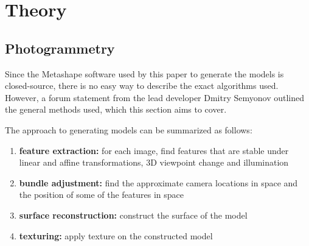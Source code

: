 % 
% 
% 
% 

\chapter{Theory}


\section{Photogrammetry}
Since the Metashape software used by this paper to generate the models is closed-source, there is no easy way to describe the exact algorithms used.
However, a forum statement from the lead developer Dmitry Semyonov \parencite{metashapeForumPost} outlined the general methods used, which this section aims to cover.

The approach to generating models can be summarized as follows:

\begin{enumerate}
	\item \textbf{feature extraction:} for each image, find features that are stable under linear and affine transformations, 3D viewpoint change and illumination
	\item \textbf{bundle adjustment:} find the approximate camera locations in space and the position of some of the features in space
	\item \textbf{surface reconstruction:} construct the surface of the model
	\item \textbf{texturing:} apply texture on the constructed model
\end{enumerate}

